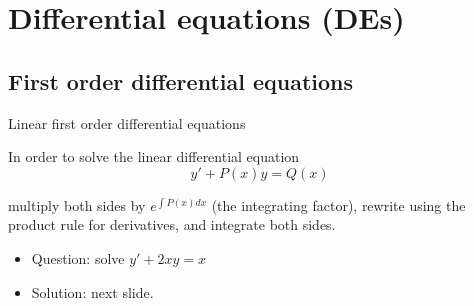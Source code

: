 \iffalse

MIT License

Copyright (c) 2023 Aron Hardeman

Permission is hereby granted, free of charge, to any person obtaining a copy
of this software and associated documentation files (the "Software"), to deal
in the Software without restriction, including without limitation the rights
to use, copy, modify, merge, publish, distribute, sublicense, and/or sell
copies of the Software, and to permit persons to whom the Software is
furnished to do so, subject to the following conditions:

The above copyright notice and this permission notice shall be included in all
copies or substantial portions of the Software.

THE SOFTWARE IS PROVIDED "AS IS", WITHOUT WARRANTY OF ANY KIND, EXPRESS OR
IMPLIED, INCLUDING BUT NOT LIMITED TO THE WARRANTIES OF MERCHANTABILITY,
FITNESS FOR A PARTICULAR PURPOSE AND NONINFRINGEMENT. IN NO EVENT SHALL THE
AUTHORS OR COPYRIGHT HOLDERS BE LIABLE FOR ANY CLAIM, DAMAGES OR OTHER
LIABILITY, WHETHER IN AN ACTION OF CONTRACT, TORT OR OTHERWISE, ARISING FROM,
OUT OF OR IN CONNECTION WITH THE SOFTWARE OR THE USE OR OTHER DEALINGS IN THE
SOFTWARE.

\fi
\section{Differential equations (DEs)}
\subsection{First order differential equations}
\begin{frame}{Linear first order differential equations}
    \begin{tcolorbox}[colback=blue!5,colframe=blue!75!black,title=Linear first order DE]
In order to solve the linear differential equation \[y'+P(x)y=Q(x)\]

multiply both sides by $e^{\int P(x)dx}$ (the integrating factor), rewrite using the product rule for derivatives, and integrate both sides.
\end{tcolorbox}
\begin{itemize}
    \item Question: solve $y'+2x y=x$
    \item Solution: next slide.
\end{itemize}
\end{frame}

